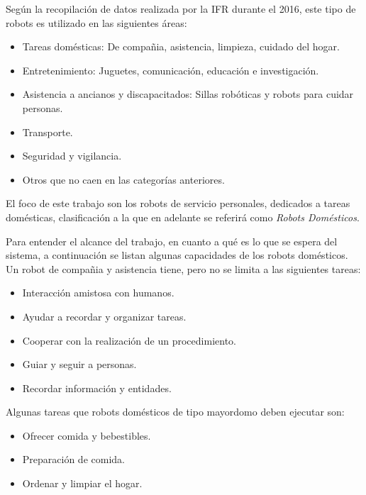 Seg\'un la recopilaci\'on de datos realizada por la IFR durante el 2016, este tipo de robots es utilizado en las siguientes \'areas:
\begin{itemize}[topsep=0pt]
\setlength\itemsep{0.2em}
\item Tareas dom\'esticas: De compa\~nia, asistencia, limpieza, cuidado del hogar.
\item Entretenimiento: Juguetes, comunicaci\'on, educaci\'on e investigaci\'on.
\item Asistencia a ancianos y discapacitados: Sillas rob\'oticas y robots para cuidar personas.
\item Transporte.
\item Seguridad y vigilancia.
\item Otros que no caen en las categor\'ias anteriores.
\end{itemize}
\bigskip

El foco de este trabajo son los robots de servicio personales, dedicados a tareas dom\'esticas, clasificaci\'on a la que en  adelante se referir\'a como \textit{Robots Dom\'esticos}.

Para entender el alcance del trabajo, en cuanto a qu\'e es lo que se espera del sistema, a continuaci\'on se listan algunas capacidades de los robots dom\'esticos. Un robot de compa\~nia y asistencia tiene, pero no se limita a las siguientes tareas:
\begin{itemize}[topsep=0pt]
\setlength\itemsep{0.2em}
\item Interacci\'on amistosa con humanos.
\item Ayudar a recordar y organizar tareas.
\item Cooperar con la realizaci\'on de un procedimiento.
\item Guiar y seguir a personas.
\item Recordar informaci\'on y entidades.
\end{itemize}
\bigskip

Algunas tareas que robots dom\'esticos de tipo mayordomo deben ejecutar son:
\begin{itemize}[topsep=0pt]
\setlength\itemsep{0.2em}
\item Ofrecer comida y bebestibles.
\item Preparaci\'on de comida.
\item Ordenar y limpiar el hogar.
\end{itemize}
\bigskip



